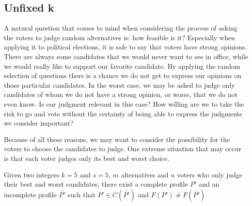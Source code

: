 \documentclass[version=3.21, pagesize, twoside=off, bibliography=totoc, DIV=calc, fontsize=12pt, a4paper]{scrartcl}
\begin{document}
\subsection{Unfixed k}

A natural question that comes to mind when considering the process of asking the voters to judge random alternatives is: how feasible is it? Especially when applying it to political elections, it is safe to say that voters have strong opinions. There are always some candidates that we would never want to see in office, while we would really like to support our favorite candidate. By applying the random selection of questions there is a chance we do not get to express our opinions on those particular candidates. In the worst case, we may be asked to judge only candidates of whom we do not have a strong opinion, or worse, that we do not even know. Is our judgment relevant in this case? How willing are we to take the risk to go and vote without the certainty of being able to express the judgments we consider important?

Because of all these reasons, we may want to consider the possibility for the voters to choose the candidates to judge. One extreme situation that may occur is that each voter judges only its best and worst choice. 

\begin{proposition}
	Given two integers $k=5$ and $s=5$, $m$ alternatives and $n$ voters who only judge their best and worst candidates, there exist a complete profile $P'$ and an incomplete profile $\bar{P'}$ such that $P'\in C(\bar{P'})$ and $F(P')\neq F(\bar{P'})$.
\end{proposition}	
\end{document}
